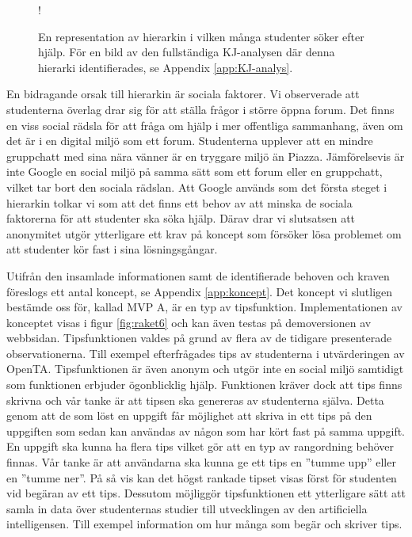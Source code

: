 \begin{figure}[hbtp]
    \centering
    \hspace{-20px}
    \resizebox {1\textwidth} {!} {
        
    }
    \caption{En representation av hierarkin i vilken många studenter söker efter hjälp. För en bild av den fullständiga KJ-analysen där denna hierarki identifierades, se Appendix \ref{app:KJ-analys}. }
    \label{fig:raket5}
\end{figure}

En bidragande orsak till hierarkin är sociala faktorer. Vi observerade att studenterna överlag drar sig för att ställa frågor i större öppna forum. Det finns en viss social rädsla för att fråga om hjälp i mer offentliga sammanhang, även om det är i en digital miljö som ett forum. Studenterna upplever att en mindre gruppchatt med sina nära vänner är en tryggare miljö än Piazza. Jämförelsevis är inte Google en social miljö på samma sätt som ett forum eller en gruppchatt, vilket tar bort den sociala rädslan. Att Google används som det första steget i hierarkin tolkar vi som att det finns ett behov av att minska de sociala faktorerna för att studenter ska söka hjälp. Därav drar vi slutsatsen att anonymitet utgör ytterligare ett krav på koncept som försöker lösa problemet om att studenter kör fast i sina lösningsgångar.


Utifrån den insamlade informationen samt de identifierade behoven och kraven föreslogs ett antal koncept, se Appendix \ref{app:koncept}. Det koncept vi slutligen bestämde oss för, kallad MVP A, är en typ av tipsfunktion. Implementationen av konceptet visas i figur \ref{fig:raket6} och kan även testas på demoversionen av webbsidan. Tipsfunktionen valdes på grund av flera av de tidigare presenterade observationerna. Till exempel efterfrågades tips av studenterna i utvärderingen av OpenTA. Tipsfunktionen är även anonym och utgör inte en social miljö samtidigt som funktionen erbjuder ögonblicklig hjälp. Funktionen kräver dock att tips finns skrivna och vår tanke är att tipsen ska genereras av studenterna själva. Detta genom att de som löst en uppgift får möjlighet att skriva in ett tips på den uppgiften som sedan kan användas av någon som har kört fast på samma uppgift. En uppgift ska kunna ha flera tips vilket gör att en typ av rangordning behöver finnas. Vår tanke är att användarna ska kunna ge ett tips en ''tumme upp'' eller en ''tumme ner''. På så vis kan det högst rankade tipset visas först för studenten vid begäran av ett tips. Dessutom möjliggör tipsfunktionen ett ytterligare sätt att samla in data över studenternas studier till utvecklingen av den artificiella intelligensen. Till exempel information om hur många som begär och skriver tips.

